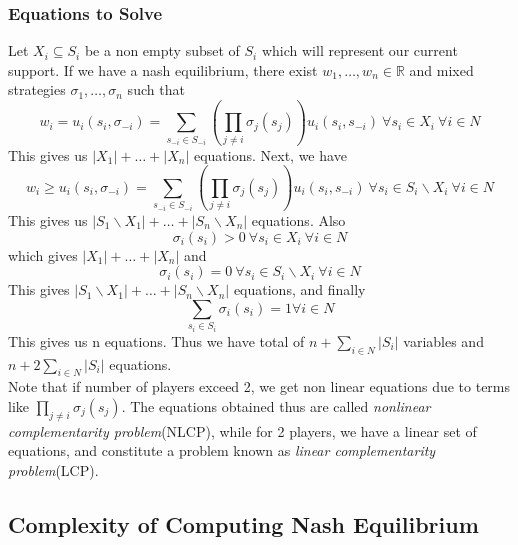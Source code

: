 \documentclass{article}
\theoremstyle{definition}
\begin{document}
\subsubsection{Equations to Solve}
Let $X_i\subseteq S_i$ be a non empty subset of $S_i$ which will represent our current support. If we have a nash equilibrium, there exist $w_1,\dots,w_n \in \mathbb{R}$ and mixed strategies $\sigma_1,\dots,\sigma_n$ such that $$w_i = u_i(s_i, \sigma_{-i}) = \sum_{s_{-i}\in S_{-i}}\left(\prod_{j\neq i}\sigma_j(s_j)\right) u_i(s_i,s_{-i}) ~\forall s_i\in X_i ~\forall i\in N$$ 
This gives us $|X_1|+\dots+|X_n|$ equations. Next, we have $$w_i\geq u_i(s_i,\sigma_{-i}) = \sum_{s_{-i}\in S_{-i}}\left(\prod_{j\neq i}\sigma_j(s_j)\right) u_i(s_i,s_{-i}) ~\forall s_i\in S_i\backslash X_i ~\forall i\in N$$ 
This gives us $|S_1\backslash X_1| + \dots + |S_n\backslash X_n|$ equations. Also $$\sigma_i(s_i)>0 ~\forall s_i\in X_i ~\forall i\in N$$ which gives $|X_1|+\dots+|X_n|$ and $$\sigma_i(s_i)=0 ~\forall s_i\in S_i\backslash X_i ~\forall i\in N$$ This gives $|S_1\backslash X_1| + \dots + |S_n\backslash X_n|$ equations, and finally $$\sum_{s_i\in S_i} \sigma_i(s_i) = 1 \forall i\in N$$ This gives us n equations. Thus we have total of $n +\sum_{i\in N} |S_i|$ variables and $n +2\sum_{i\in N} |S_i|$ equations.\\
Note that if number of players exceed 2, we get non linear equations due to terms like $\prod_{j\neq i} \sigma_j(s_j)$. The equations obtained thus are called \textit{nonlinear complementarity problem}(NLCP), while for 2 players, we have a linear set of equations, and constitute a problem known as \textit{linear complementarity problem}(LCP).
\subsection{Complexity of Computing Nash Equilibrium}
\end{document}
